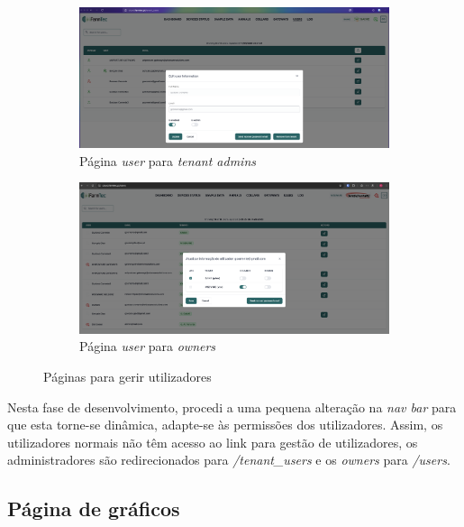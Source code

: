 \begin{figure}[!h]
	\centering
	\begin{subfigure}[c]{0.45\textwidth}
		\centering
		\includegraphics[width=\textwidth]{figs/userAdmin.png}
		\caption{Página \textit{user} para \textit{tenant admins}}
		\label{fig:user-Admin}
	\end{subfigure}
	\hfill
	\begin{subfigure}[c]{0.45\textwidth}
		\centering
		\includegraphics[width=\textwidth]{figs/userOWNER.png}
		\caption{Página \textit{user} para \textit{owners}}
		\label{fig:user-Owner}
	\end{subfigure}
	\caption{Páginas para gerir utilizadores}
    \label{fig:gestUsers}
\end{figure}

Nesta fase de desenvolvimento, procedi a uma pequena alteração na \textit{nav bar} para que esta torne-se dinâmica, adapte-se às permissões dos utilizadores. Assim, os utilizadores normais não têm acesso ao link para gestão de utilizadores, os administradores são redirecionados para \textit{/tenant\_users} e os \textit{owners} para \textit{/users}.

\clearpage
\subsection{Página de gráficos} %

